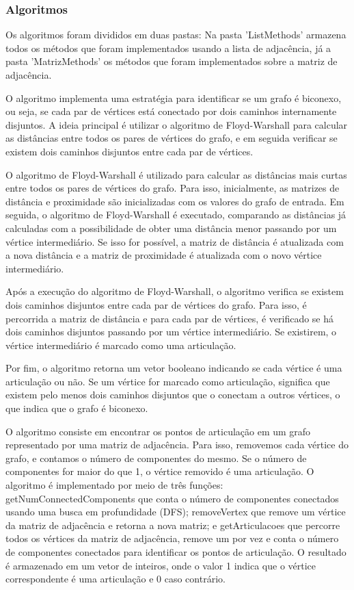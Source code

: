 \subsubsection{\esp Algoritmos}
Os algoritmos foram divididos em duas pastas: Na pasta 'ListMethods' armazena todos os métodos que foram implementados usando a lista de adjacência, já a pasta 'MatrizMethods' os métodos que foram implementados sobre a matriz de adjacência.

 
O algoritmo implementa uma estratégia para identificar se um grafo é biconexo, ou seja, se cada par de vértices está conectado por dois caminhos internamente disjuntos. A ideia principal é utilizar o algoritmo de Floyd-Warshall para calcular as distâncias entre todos os pares de vértices do grafo, e em seguida verificar se existem dois caminhos disjuntos entre cada par de vértices.

O algoritmo de Floyd-Warshall é utilizado para calcular as distâncias mais curtas entre todos os pares de vértices do grafo. Para isso, inicialmente, as matrizes de distância e proximidade são inicializadas com os valores do grafo de entrada. Em seguida, o algoritmo de Floyd-Warshall é executado, comparando as distâncias já calculadas com a possibilidade de obter uma distância menor passando por um vértice intermediário. Se isso for possível, a matriz de distância é atualizada com a nova distância e a matriz de proximidade é atualizada com o novo vértice intermediário.

Após a execução do algoritmo de Floyd-Warshall, o algoritmo verifica se existem dois caminhos disjuntos entre cada par de vértices do grafo. Para isso, é percorrida a matriz de distância e para cada par de vértices, é verificado se há dois caminhos disjuntos passando por um vértice intermediário. Se existirem, o vértice intermediário é marcado como uma articulação.

Por fim, o algoritmo retorna um vetor booleano indicando se cada vértice é uma articulação ou não. Se um vértice for marcado como articulação, significa que existem pelo menos dois caminhos disjuntos que o conectam a outros vértices, o que indica que o grafo é biconexo.
 
 
 
O algoritmo consiste em encontrar os pontos de articulação em um grafo representado por uma matriz de adjacência. Para isso, removemos cada vértice do grafo, e contamos o número de componentes do mesmo. 
Se o número de componentes for maior do que 1, o vértice removido é uma articulação. O algoritmo é implementado por meio de três funções: getNumConnectedComponents que conta o número de componentes conectados usando uma busca em profundidade (DFS); removeVertex que remove um vértice da matriz de adjacência e retorna a nova matriz; e getArticulacoes que percorre todos os vértices da matriz de adjacência, remove um por vez e conta o número de componentes conectados para identificar os pontos de articulação. O resultado é armazenado em um vetor de inteiros, onde o valor 1 indica que o vértice correspondente é uma articulação e 0 caso contrário.

